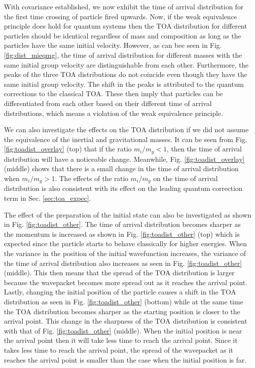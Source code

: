 \documentclass[%
 reprint,
 amsmath,amssymb,
 aps,
]{revtex4-1}
\begin{document}
With covariance established, we now exhibit the time of arrival distribution for the first time crossing of particle fired upwards. Now, if the weak equivalence principle does hold for quantum systems then the TOA distribution for different particles should be identical regardless of mass and composition as long as the particles have the same initial velocity. However, as can bee seen in Fig. \ref{fig:dist_mieqmg}, the time of arrival distribution for different masses with the same initial group velocity are distinguishable from each other. Furthermore,  the peaks of the three TOA distributions do not coincide even though they have the same initial group velocity. The shift in the peaks is attributed to the quantum corrections to the classical TOA. These then imply that particles can be differentiated from each other based on their different time of arrival distributions, which means a violation of the weak equivalence principle. 

We can also investigate the effects on the TOA distribution if we did not assume the equivalence of the inertial and gravitational masses. It can be seen from Fig. \ref{fig:toadist_overlay} (top) that if the ratio $m_i/m_g<1$, then the time of arrival distribution will have a noticeable change. Meanwhile, Fig. \ref{fig:toadist_overlay} (middle) shows that there is a small change in the time of arrival distribution when $m_i/m_g>1$. The effects of the ratio $m_i/m_g$ on the time of arrival distribution is also consistent with its effect on the leading quantum correction term in Sec. \ref{sec:toa_expec}. 

The effect of the preparation of the initial state can also be investigated as shown in Fig. \ref{fig:toadist_other}. The time of arrival distribution becomes sharper as the momentum is increased as shown in Fig. \ref{fig:toadist_other} (top) which is expected since the particle starts to behave classically for higher energies. When the variance in the position of the initial wavefunction increases, the variance of the time of arrival distribution also increases as seen in Fig. \ref{fig:toadist_other} (middle). This then means that the spread of the TOA distribution is larger because the wavepacket becomes more spread out as it reaches the arrival point. Lastly, changing the initial position of the particle causes a shift in the TOA distribution as seen in Fig. \ref{fig:toadist_other} (bottom) while at the same time the TOA distribution becomes sharper as the starting position is closer to the arrival point. This change in the sharpness of the TOA distribution is consistent with that of Fig. \ref{fig:toadist_other} (middle). When the initial position is near the arrival point then it will take less time to reach the arrival point. Since it takes less time to reach the arrival point, the spread of the wavepacket as it reaches the arrival point is smaller than the case when the initial position is far.
\end{document}
